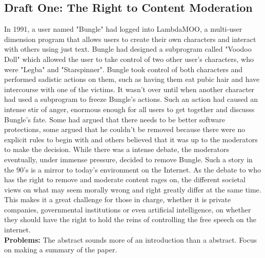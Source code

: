 \documentclass[a4paper]{article}
\begin{document}
\subsection{Draft One: The Right to Content Moderation}
In 1991, a user named "Bungle" had logged into LambdaMOO, a multi-user dimension program that allows users to create
their own characters and interact with others using just text. Bungle had designed a subprogram called "Voodoo Doll"
which allowed the user to take control of two other user's characters, who were "Legba" and "Starspinner". Bungle took 
control of both characters and performed sadistic actions on them, such as having them eat pubic hair and have intercourse with
one of the victims. It wasn't over until when another character had used a subprogram to freeze Bungle's actions. Such an
action had caused an intense stir of anger, enormous enough for all users to get together and  discusss Bungle's fate. Some had 
argued that there needs to be better software protections, some argued that he couldn't be removed because there 
were no explicit rules to begin with and others believed that it was up to the moderators to make the decision. 
While there was a intense debate, the moderators eventually, under immense pressure, decided to remove Bungle. Such a story
in the 90's is a mirror to today's environment on the Internet. As the debate to who has the right to remove and moderate
content rages on, the different societal views on what may seem morally wrong and right greatly differ at the same time. This 
makes it a great challenge for those in charge, whether it is private companies, governmental institutions or even artificial 
intelligence, on whether they should have the right to hold the reins of controlling the free speech on the internet. \\

\noindent \textbf{Problems:} The abstract sounds more of an introduction than a abstract. Focus on making a summary of the paper.
\end{document}
